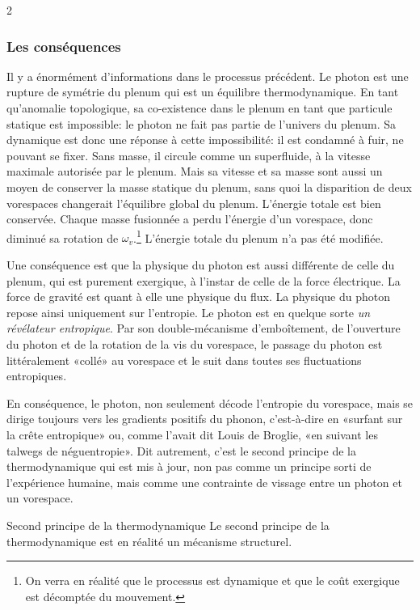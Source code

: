 \begin{multicols}{2}
\subsubsection{Les conséquences}

Il y a énormément d'informations dans le processus précédent. Le photon est une
rupture de symétrie du plenum qui est un équilibre thermodynamique. En
tant qu'anomalie topologique, sa co-existence dans le plenum en tant
que particule statique est impossible: le photon ne fait pas partie de
l'univers du plenum. Sa dynamique est donc une réponse à cette
impossibilité: il est condamné à fuir, ne pouvant se fixer. Sans
masse, il circule comme un superfluide, à la vitesse maximale
autorisée par le plenum. Mais sa vitesse et sa masse sont aussi un
moyen de conserver la masse statique du plenum, sans quoi la
disparition de deux vorespaces changerait l'équilibre global du plenum.
L'énergie totale est  bien conservée. Chaque masse fusionnée a perdu
l'énergie d'un vorespace, donc diminué sa rotation de $\omega_v$.\footnote{On verra en réalité que le processus est dynamique et que le coût exergique est décomptée du mouvement.} L'énergie
totale du plenum n'a pas été modifiée.

Une conséquence est que la physique du photon est aussi différente de celle du plenum, 
qui est purement exergique, à l'instar de celle de la force
électrique. La force de gravité est quant à elle une physique du flux. La physique
du photon repose ainsi uniquement sur l'entropie. Le photon est en quelque sorte \textit{un
révélateur entropique}. Par son double-mécanisme d'emboîtement, de
l'ouverture du photon et de la rotation de la vis du vorespace, le
passage du photon est littéralement «collé» au vorespace et le suit
dans toutes ses fluctuations entropiques. 

En conséquence, le photon,
non seulement décode l'entropie du vorespace, mais se dirige toujours
vers les gradients positifs du phonon, c'est-à-dire en «surfant sur
la crête entropique» ou, comme l'avait dit Louis de Broglie, «en
suivant les talwegs de néguentropie». Dit autrement, c'est le
second principe de la thermodynamique qui est mis à jour, non pas
comme un principe sorti de l'expérience humaine, mais comme une
contrainte de vissage entre un photon et un vorespace. 

\begin{mybox}[breakable,colback=blue!10, colbacktitle=pkcolor]{Second principe de la thermodynamique}
	Le second principe de la thermodynamique est en réalité un mécanisme 
	structurel.
\end{mybox}
\medskip



\end{multicols}
